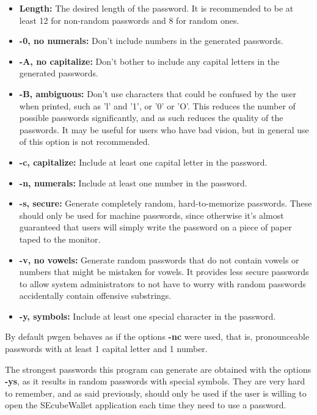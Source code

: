 \begin{itemize}
\setlength\itemsep{0pt}

\item \textbf{Length:} The desired length of the password. It is recommended to be at least 12 for non-random passwords and 8 for random ones.

\item \textbf{-0, no numerals:} 
Don't include numbers in the generated passwords. 

\item \textbf{-A, no capitalize:} 
Don't bother to include any capital letters in the generated passwords. 
    
\item \textbf{-B, ambiguous:}
Don't use characters that could be confused by the user when printed, such as 'l' and '1', or '0' or 'O'. This reduces the number of possible passwords significantly, and as such reduces the quality of the passwords. It may be useful for users who have bad vision, but in general use of this option is not recommended. 
    
\item \textbf{-c, capitalize:}
Include at least one capital letter in the password.

\item \textbf{-n, numerals:}
Include at least one number in the password.

\item \textbf{-s, secure:}
Generate completely random, hard-to-memorize passwords. These should only be used for machine passwords, since otherwise it's almost guaranteed that users will simply write the password on a piece of paper taped to the monitor.

\item \textbf{-v, no vowels:}
Generate random passwords that do not contain vowels or numbers that might be mistaken for vowels. It provides less secure passwords to allow system administrators to not have to worry with random passwords accidentally contain offensive substrings. 

\item \textbf{-y, symbols:}
Include at least one special character in the password.
\end{itemize}

By default pwgen behaves as if the options \textbf{-nc} were used, that is, pronounceable passwords with at least 1 capital letter and 1 number.

The strongest passwords this program can generate are obtained with the options \textbf{-ys}, as it results in random passwords with special symbols. They are very hard to remember, and as said previously, should only be used if the user is willing to open the SEcubeWallet application each time they need to use a password.


